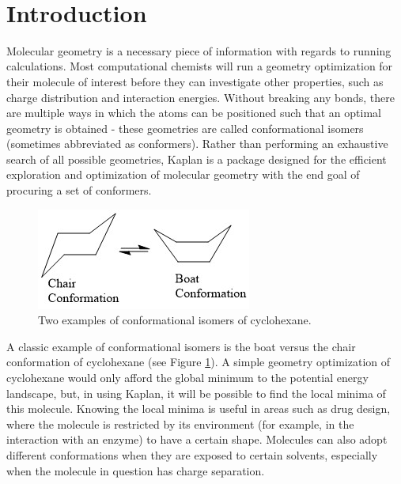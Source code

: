 \documentclass[12pt]{article}
\newcommand{\progname}{Kaplan} %
\begin{document}
\newpage

\tableofcontents

~\newpage


\section{Introduction} \label{intro}

Molecular geometry is a necessary piece of information with regards to running 
calculations. Most computational chemists will run a 
geometry optimization for 
their molecule of interest before they can investigate 
other properties, such as 
charge distribution and interaction energies. Without breaking any bonds, there 
are multiple ways in which the atoms can be positioned such that an optimal 
geometry is obtained - these geometries are called conformational isomers 
(sometimes abbreviated as conformers). Rather than 
performing an exhaustive 
search of all possible geometries, \progname{} is a 
package designed for the 
efficient exploration and optimization of molecular 
geometry with the end goal 
of procuring a set of conformers.


\begin{figure}[H]
	\begin{center}
	\includegraphics[]{C6H14}
	\end{center}
	\caption{Two examples of conformational isomers of cyclohexane.}
	\label{C6H14}
\end{figure}


A classic example of conformational isomers is the boat versus the chair 
conformation of cyclohexane (see Figure \ref{C6H14}). A simple geometry 
optimization of cyclohexane would only afford the 
global minimum to the 
potential energy landscape, but, in using \progname{}, it will be possible to 
find the local minima of this molecule.  Knowing the 
local minima is useful in 
areas such as drug design, where the molecule is restricted by its environment 
(for example, in the interaction with an enzyme) to have a certain shape. 
Molecules can also adopt different conformations when they are exposed to 
certain solvents, especially when the molecule in question has charge 
separation.
\end{document}
